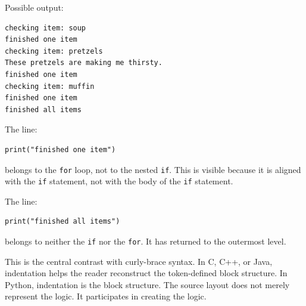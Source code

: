 Possible output:

\begin{verbatim}
checking item: soup
finished one item
checking item: pretzels
These pretzels are making me thirsty.
finished one item
checking item: muffin
finished one item
finished all items
\end{verbatim}

The line:

\begin{verbatim}
print("finished one item")
\end{verbatim}

belongs to the \texttt{for} loop, not to the nested \texttt{if}. This is visible because it is aligned with the \texttt{if} statement, not with the body of the \texttt{if} statement.

The line:

\begin{verbatim}
print("finished all items")
\end{verbatim}

belongs to neither the \texttt{if} nor the \texttt{for}. It has returned to the outermost level.

This is the central contrast with curly-brace syntax. In C, C++, or Java, indentation helps the reader reconstruct the token-defined block structure. In Python, indentation is the block structure. The source layout does not merely represent the logic. It participates in creating the logic.